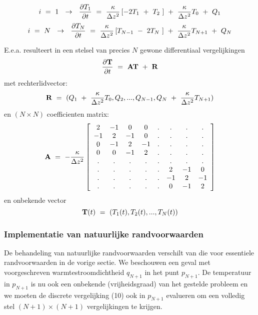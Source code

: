 \vspace{0.5cm}
\noindent
\begin{equation}
i \ =\  1 \ \ \to\ \ 
{\partial T_1  \over \partial t} 
\ =\ 
{\kappa \over \Delta z^2} 
\left[
       -2 T_1 \ +\  T_2 \ 
\right]
\ +\ 
{\kappa \over \Delta z^2} T_0 \ +\  Q_1
\end{equation}
\begin{equation}
i \ =\  N \ \ \to\ \ 
{\partial T_N  \over \partial t} 
\ =\ 
{\kappa \over \Delta z^2} 
\left[
       T_{N-1} \ -\  2 T_N \ 
\right]
\ +\ 
{\kappa \over \Delta z^2} T_{N+1} \ +\  Q_N
\end{equation}

\vspace{0.5cm}
\noindent
E.e.a. resulteert in
een stelsel van precies $N$ gewone differentiaal vergelijkingen
\begin{equation}
{\partial {\bf T}   \over \partial t}
\ =\ 
{\bf A} {\bf T} \ +\  {\bf R}
\end{equation}
met rechterlidvector:
\begin{equation}
{\bf R} \ =\  ( 
Q_1 \ +\  {\kappa \over \Delta z^2} T_0 ,
Q_2 ,
 ... ,
Q_{N-1} ,
Q_N \ +\  {\kappa \over \Delta z^2} T_{N+1}
)
\end{equation}
en $( N \times N )$ coefficienten matrix:
\begin{equation}
{\bf A} \ =\  - {\kappa \over  \Delta z^2}
\left[
\begin{array}{cccccccc}
 2  &-1 &  0 &  0  & . &  . &  . & . \\
-1  & 2 & -1 &  0  & . &  . &  . & . \\
 0  &-1 &  2 & -1  & . &  . &  . & . \\
 0  & 0 & -1 &  2  & . &  . &  . & . \\
 .  & . &  . &  .  & . &  . &  . & . \\
 .  & . &  . &  .  & . &  2 & -1 &  0\\
 .  & . &  . &  .  & . & -1 &  2 & -1\\
 .  & . &  . &  .  & . &  0 & -1 &  2 
\end{array}
\right]
\end{equation}
en onbekende vector 
\begin{equation}
{\bf T} (t) \ =\  ( T_1 (t), T_2 (t), ... , T_N (t))
\end{equation}
\subsubsection{Implementatie van natuurlijke randvoorwaarden}
De behandeling van natuurlijke randvoorwaarden verschilt van die
voor essentiele randvoorwaarden in de vorige sectie.
We beschouwen een geval met voorgeschreven warmtestroomdichtheid
$q_{N+1}$ in het punt $p_{N+1}$.
De temperatuur in $p_{N+1}$ is nu ook een onbekende (vrijheidsgraad)
van het gestelde probleem en we moeten de discrete vergelijking (10)
ook in $p_{N+1}$ evalueren om een volledig stel 
$(N+1) \times (N+1)$  vergelijkingen te krijgen.

